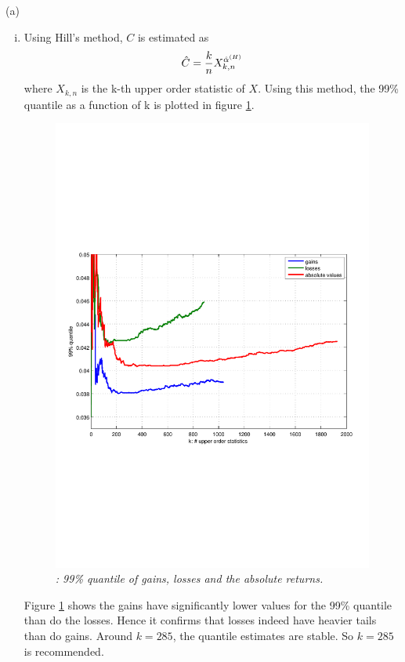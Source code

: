 \documentclass{report}
\begin{document}
\begin{enumerate}[1.]
\begin{enumerate}{(a)}
\begin{enumerate}[(i)]
    \item Using Hill's method, $C$ is estimated as
      \[
      \hat{C} = {k \over n} X_{k, n}^{\hat{\alpha}^{(H)}}
      \]
      where $X_{k,n}$ is the k-th upper order statistic of $X$. Using
      this method, the 99\% quantile as a function of k is plotted in
      figure \ref{fig:99_percentile}.
      \begin{figure}[htb!]
        \centering
        \includegraphics[scale=0.6, clip=true, trim=20 233 28
        185]{99_percentile.pdf}
        \caption{\small \it: 99\% quantile of gains, losses and the
          absolute returns.}
        \label{fig:99_percentile}
      \end{figure}

      Figure \ref{fig:99_percentile} shows the gains have
      significantly lower values for the 99\% quantile than do the
      losses. Hence it confirms that losses 
      indeed have heavier tails than do gains. Around $k=285$, the
      quantile estimates are stable. So $k=285$ is recommended.
    \end{enumerate}
  \end{enumerate}
\end{enumerate}
\end{document}
